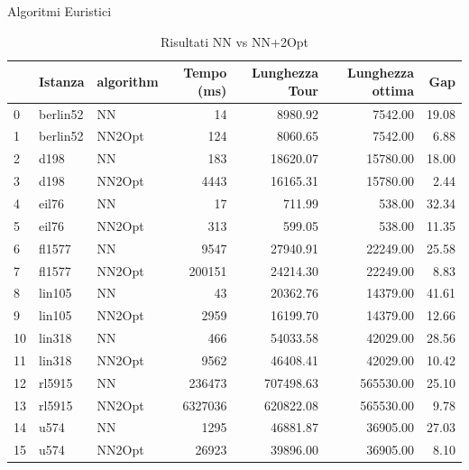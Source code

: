 \documentclass{beamer}
\begin{document}
\begin{frame}{Algoritmi Euristici}
    \begin{table}
        \centering
        \caption{Risultati NN vs NN+2Opt}
        \begin{tabular}{lllrrrr}
            \toprule
               & Istanza  & algorithm & Tempo (ms) & Lunghezza Tour & Lunghezza ottima & Gap   \\
            \midrule
            0  & berlin52 & NN        & 14         & 8980.92        & 7542.00          & 19.08 \\
            1  & berlin52 & NN2Opt    & 124        & 8060.65        & 7542.00          & 6.88  \\
            2  & d198     & NN        & 183        & 18620.07       & 15780.00         & 18.00 \\
            3  & d198     & NN2Opt    & 4443       & 16165.31       & 15780.00         & 2.44  \\
            4  & eil76    & NN        & 17         & 711.99         & 538.00           & 32.34 \\
            5  & eil76    & NN2Opt    & 313        & 599.05         & 538.00           & 11.35 \\
            6  & fl1577   & NN        & 9547       & 27940.91       & 22249.00         & 25.58 \\
            7  & fl1577   & NN2Opt    & 200151     & 24214.30       & 22249.00         & 8.83  \\
            8  & lin105   & NN        & 43         & 20362.76       & 14379.00         & 41.61 \\
            9  & lin105   & NN2Opt    & 2959       & 16199.70       & 14379.00         & 12.66 \\
            10 & lin318   & NN        & 466        & 54033.58       & 42029.00         & 28.56 \\
            11 & lin318   & NN2Opt    & 9562       & 46408.41       & 42029.00         & 10.42 \\
            12 & rl5915   & NN        & 236473     & 707498.63      & 565530.00        & 25.10 \\
            13 & rl5915   & NN2Opt    & 6327036    & 620822.08      & 565530.00        & 9.78  \\
            14 & u574     & NN        & 1295       & 46881.87       & 36905.00         & 27.03 \\
            15 & u574     & NN2Opt    & 26923      & 39896.00       & 36905.00         & 8.10  \\
            \bottomrule
        \end{tabular}
    \end{table}
\end{frame}
\end{document}
